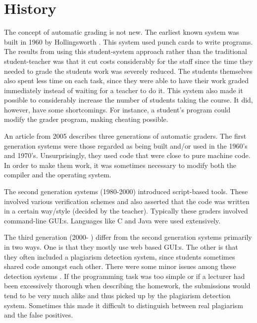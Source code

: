 \section{History}
The concept of automatic grading is not new. The earliest known system was built in 1960 by Hollingsworth \cite{Hollingsworth}. This system used punch cards to write programs. The results from using this student-system approach rather than the traditional student-teacher was that it cut costs considerably for the staff since the time they needed to grade the students work was severely reduced. The students themselves also spent less time on each task, since they were able to have their work graded immediately instead of waiting for a teacher to do it. This system also made it possible to considerably increase the number of students taking the course. It did, however, have some shortcomings. For instance, a student's program could modify the grader program, making cheating possible. 

An article from 2005 \cite{GenerationReview} describes three generations of automatic graders. The first generation systems were those regarded as being built and/or used in the 1960's and 1970's. Unsurprisingly, they used code that were close to pure machine code. In order to make them work, it was sometimes necessary to modify both the compiler and the operating system. 

The second generation systems (1980-2000) introduced script-based tools. These involved various verification schemes and also asserted that the code was written in a certain way/style (decided by the teacher). Typically these graders involved command-line GUI:s. Languages like C and Java were used extensively.

The third generation (2000- ) differ from the second generation systems primarily in two ways. One is that they mostly use web based GUI:s. The other is that they often included a plagiarism detection system, since students sometimes shared code amongst each other. There were some minor issues among these detection systems \cite{Gradebot} \cite{GenerationReview}. If the programming task was too simple or if a lecturer had been excessively thorough when describing the homework, the submissions would tend to be very much alike and thus picked up by the plagiarism detection system. Sometimes this made it difficult to distinguish between real plagiarism and the false positives. 